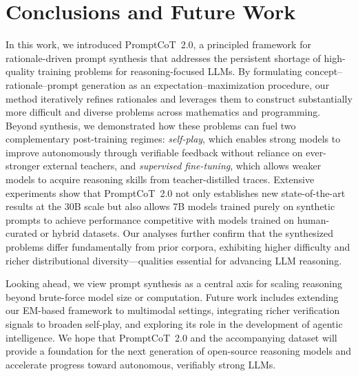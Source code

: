 \section{Conclusions and Future Work}
In this work, we introduced PromptCoT~2.0, a principled framework for rationale-driven prompt synthesis that addresses the persistent shortage of high-quality training problems for reasoning-focused LLMs.  
By formulating concept–rationale–prompt generation as an expectation–maximization procedure, our method iteratively refines rationales and leverages them to construct substantially more difficult and diverse problems across mathematics and programming.  
Beyond synthesis, we demonstrated how these problems can fuel two complementary post-training regimes: \emph{self-play}, which enables strong models to improve autonomously through verifiable feedback without reliance on ever-stronger external teachers, and \emph{supervised fine-tuning}, which allows weaker models to acquire reasoning skills from teacher-distilled traces.  Extensive experiments show that PromptCoT~2.0 not only establishes new state-of-the-art results at the 30B scale but also allows 7B models trained purely on synthetic prompts to achieve performance competitive with models trained on human-curated or hybrid datasets. 
Our analyses further confirm that the synthesized problems differ fundamentally from prior corpora, exhibiting higher difficulty and richer distributional diversity—qualities essential for advancing LLM reasoning.  

Looking ahead, we view prompt synthesis as a central axis for scaling reasoning beyond brute-force model size or computation.  
Future work includes extending our EM-based framework to multimodal settings, integrating richer verification signals to broaden self-play, and exploring its role in the development of agentic intelligence.  
We hope that PromptCoT~2.0 and the accompanying dataset will provide a foundation for the next generation of open-source reasoning models and accelerate progress toward autonomous, verifiably strong LLMs.

